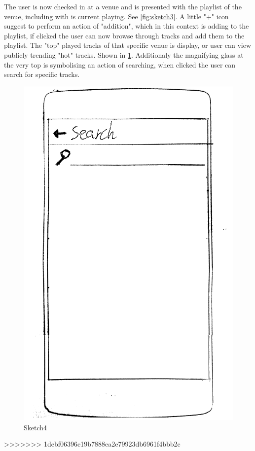 The user is now checked in at a venue and is presented with the playlist of the venue, including with is current playing. See \cref{fig:sketch3}. A little "+" icon suggest to perform an action of "addition", which in this context is adding to the playlist, if clicked the user can now browse through tracks and add them to the playlist. The "top" played tracks of that specific venue is display, or user can view publicly trending "hot" tracks. Shown in \cref{fig:sketch4}. Additionaly the magnifying glass at the very top is symbolising an action of searching, when clicked the user can search for specific tracks.

\begin{figure}
  \centering
  \includegraphics[width=0.25\linewidth]{Images/sketch4.png}
  \caption{Sketch4}
  \label{fig:sketch4}
\end{figure}
>>>>>>> 1debf06396c19b7888ea2e79923db6961f4bbb2c
